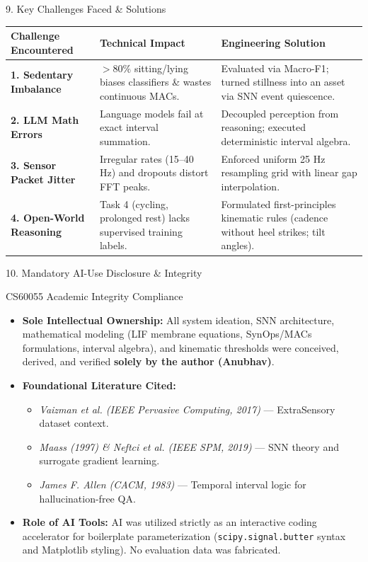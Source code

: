 \documentclass[aspectratio=169]{beamer}
\begin{document}
\begin{frame}{9. Key Challenges Faced \& Solutions}
\small
\begin{tabular}{p{}p{}p{}}
\toprule
\textbf{Challenge Encountered} & \textbf{Technical Impact} & \textbf{Engineering Solution} \\
\midrule
\textbf{1. Sedentary Imbalance} & $>80\%$ sitting/lying biases classifiers \& wastes continuous MACs. & Evaluated via Macro-F1; turned stillness into an asset via SNN event quiescence. \\
\midrule
\textbf{2. LLM Math Errors} & Language models fail at exact interval summation. & Decoupled perception from reasoning; executed deterministic interval algebra. \\
\midrule
\textbf{3. Sensor Packet Jitter} & Irregular rates (15--40 Hz) and dropouts distort FFT peaks. & Enforced uniform 25 Hz resampling grid with linear gap interpolation. \\
\midrule
\textbf{4. Open-World Reasoning} & Task 4 (cycling, prolonged rest) lacks supervised training labels. & Formulated first-principles kinematic rules (cadence without heel strikes; tilt angles). \\
\bottomrule
\end{tabular}
\end{frame}

\begin{frame}{10. Mandatory AI-Use Disclosure \& Integrity}
\begin{block}{CS60055 Academic Integrity Compliance}
\begin{itemize}
    \item \textbf{Sole Intellectual Ownership:} All system ideation, SNN architecture, mathematical modeling (LIF membrane equations, SynOps/MACs formulations, interval algebra), and kinematic thresholds were conceived, derived, and verified \textbf{solely by the author (Anubhav)}.
    \item \textbf{Foundational Literature Cited:}
    \begin{itemize}
        \item \textit{Vaizman et al. (IEEE Pervasive Computing, 2017)} — ExtraSensory dataset context.
        \item \textit{Maass (1997) \& Neftci et al. (IEEE SPM, 2019)} — SNN theory and surrogate gradient learning.
        \item \textit{James F. Allen (CACM, 1983)} — Temporal interval logic for hallucination-free QA.
    \end{itemize}
    \item \textbf{Role of AI Tools:} AI was utilized strictly as an interactive coding accelerator for boilerplate parameterization (\texttt{scipy.signal.butter} syntax and Matplotlib styling). No evaluation data was fabricated.
\end{itemize}
\end{block}
\end{frame}
\end{document}
